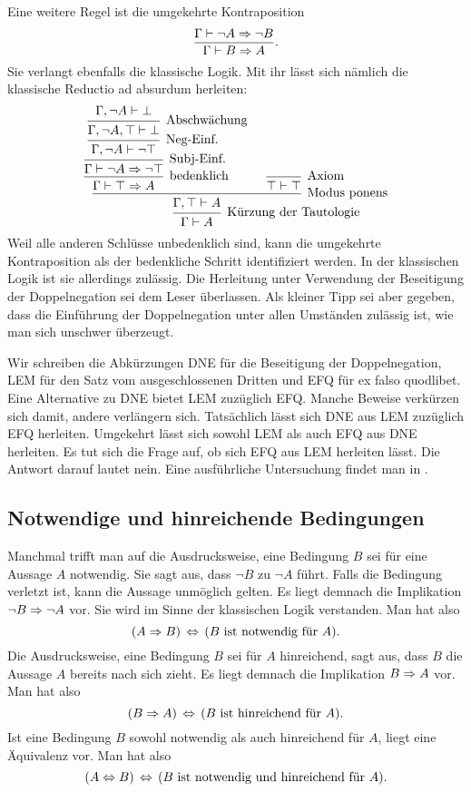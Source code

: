 Eine weitere Regel ist die umgekehrte Kontraposition
\[\dfrac{\Gamma\vdash\lnot A\Rightarrow\lnot B}{\Gamma\vdash B\Rightarrow A}.\]
Sie verlangt ebenfalls die klassische Logik. Mit ihr lässt sich
nämlich die klassische Reductio ad absurdum herleiten:
\[
\begin{prooftree}
            \hypo{\Gamma,\lnot A\vdash\bot}
          \infer1[Abschwächung]{\Gamma,\lnot A,\top\vdash\bot}
        \infer1[Neg-Einf.]{\Gamma,\lnot A\vdash\lnot\top}
      \infer1[Subj-Einf.]{\Gamma\vdash\lnot A\cond\lnot\top}
    \infer1[bedenklich]{\Gamma\vdash\top\cond A}
    \infer0[Axiom]{\top\vdash\top}
  \infer2[Modus ponens]{\Gamma,\top\vdash A}
\infer1[Kürzung der Tautologie]{\Gamma\vdash A}
\end{prooftree}
\]
Weil alle anderen Schlüsse unbedenklich sind, kann die umgekehrte
Kontraposition als der bedenkliche Schritt identifiziert werden.
In der klassischen Logik ist sie allerdings zulässig. Die Herleitung
unter Verwendung der Beseitigung der Doppelnegation sei dem Leser
überlassen. Als kleiner Tipp sei aber gegeben, dass die Einführung
der Doppelnegation unter allen Umständen zulässig ist, wie man sich
unschwer überzeugt.

Wir schreiben die Abkürzungen DNE für die Beseitigung der
Doppelnegation, LEM für den Satz vom ausgeschlossenen Dritten
und EFQ für ex falso quodlibet. Eine Alternative zu DNE bietet
LEM zuzüglich EFQ. Manche Beweise verkürzen sich damit, andere
verlängern sich. Tatsächlich lässt sich DNE aus LEM zuzüglich EFQ
herleiten. Umgekehrt lässt sich sowohl LEM als auch EFQ aus DNE
herleiten. Es tut sich die Frage auf, ob sich EFQ aus LEM herleiten
lässt. Die Antwort darauf lautet nein. Eine ausführliche Untersuchung
findet man in \cite{Diener}.

\subsection{Notwendige und hinreichende Bedingungen}

Manchmal trifft man auf die Ausdrucksweise, eine Bedingung $B$ sei für
eine Aussage $A$ notwendig. Sie sagt aus, dass $\lnot B$ zu $\lnot A$
führt. Falls die Bedingung verletzt ist, kann die Aussage unmöglich
gelten. Es liegt demnach die Implikation $\lnot B\Rightarrow\lnot A$ vor.
Sie wird im Sinne der klassischen Logik verstanden. Man hat also
\[(A\Rightarrow B)\,\Leftrightarrow\, (\text{$B$ ist notwendig für $A$}).\]
Die Ausdrucksweise, eine Bedingung $B$ sei für $A$ hinreichend,
sagt aus, dass $B$ die Aussage $A$ bereits nach sich zieht. Es liegt
demnach die Implikation $B\Rightarrow A$ vor. Man hat also
\[(B\Rightarrow A)\,\Leftrightarrow\, (\text{$B$ ist hinreichend für $A$}).\]
Ist eine Bedingung $B$ sowohl notwendig als auch hinreichend für $A$,
liegt eine Äquivalenz vor. Man hat also
\[(A\Leftrightarrow B)\,\Leftrightarrow\, (\text{$B$ ist notwendig und hinreichend für $A$}).\]

